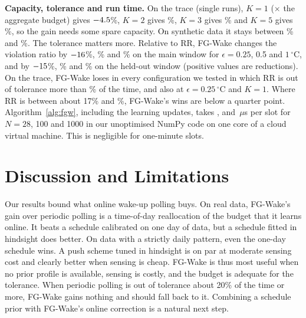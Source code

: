 \documentclass[conference]{IEEEtran}
\begin{document}
\textbf{Capacity, tolerance and run time.} On the trace (single runs), $K=1$
(\HeadCapTrOne$\times$ the aggregate budget) gives $-4.5$\%, $K=2$ gives
\HeadTrOneHalf\%, $K=3$ gives \HeadTrThree\% and $K=5$ gives \HeadTrFive\%, so the
gain needs some spare capacity. On synthetic data it stays between \HeadSyMin\% and
\HeadSyMax\%. The tolerance matters more. Relative to RR, FG-Wake changes the
violation ratio by $-16$\%, \EpsTrH\% and \EpsTrOne\% on the main window for
$\epsilon=0.25$, 0.5 and $1\,^\circ$C, and by $-15$\%, \EpsHoH\% and
\EpsHoOne\% on the held-out window (positive values are reductions). On the
trace, FG-Wake loses in every configuration we tested in which RR is out of
tolerance more than \RegimeThr\% of the time, and also at $\epsilon=0.25\,^\circ$C
and $K=1$. Where RR is between about 17\% and \RegimeThr\%, FG-Wake's wins are
below a quarter point. Algorithm~\ref{alg:fgw},
including the learning updates, takes \RtFGsmall, \RtFGmid{} and
\RtFGbig\,$\mu$s per slot for $N=28$, 100 and 1000 in our unoptimised NumPy code on
one core of a cloud virtual machine. This is negligible for one-minute slots.

\section{Discussion and Limitations}\label{sec:disc}
Our results bound what online wake-up polling buys. On real data, FG-Wake's gain
over periodic polling is a time-of-day reallocation of the budget that it learns
online. It beats a schedule calibrated on one day of data, but a schedule fitted
in hindsight does better. On data with a strictly daily pattern, even the
one-day schedule wins. A push scheme tuned in hindsight is on par at moderate
sensing cost and clearly better when sensing is cheap. FG-Wake is thus most
useful when no prior profile is available, sensing is costly, and the budget is
adequate for the tolerance. When periodic polling is out of tolerance about
20\% of the time or more, FG-Wake gains nothing and should fall back to it.
Combining a schedule prior with FG-Wake's online correction is a natural next
step.
\end{document}
